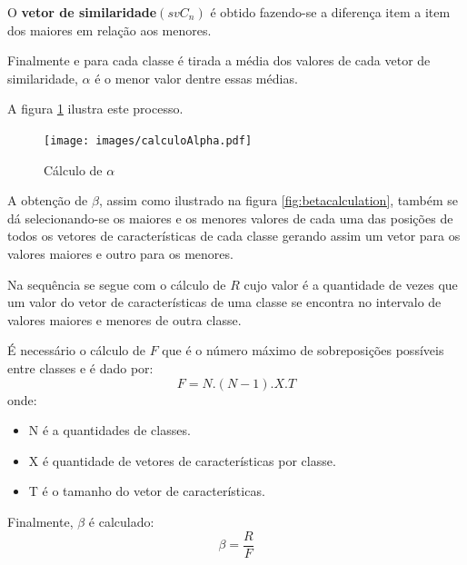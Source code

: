 \begin{myenv}{1.5}
					\par O \textbf{vetor de similaridade}$(svC_n)$ é obtido fazendo-se a diferença item a item dos maiores em relação aos menores.
					
					\par Finalmente e para cada classe é tirada a média dos valores de cada vetor de similaridade, $\alpha$ é o menor valor dentre essas médias.
					
					\par A figura \ref{fig:calculoalpha} ilustra este processo.
					
					\begin{figure}[h]
						\centering
						\texttt{[image: images/calculoAlpha.pdf]}
						\caption{Cálculo de $\alpha$}
						\label{fig:calculoalpha}
					\end{figure}
					
					\par A obtenção de $\beta$, assim como ilustrado na figura \ref{fig:betacalculation}, também se dá selecionando-se os maiores e os menores valores de cada uma das posições de todos os vetores de características de cada classe gerando assim um vetor para os valores maiores e outro para os menores.
					
					\par Na sequência se segue com o cálculo de $R$ cujo valor é a quantidade de vezes que um valor do vetor de características de uma classe se encontra no intervalo de valores maiores e menores de outra classe.
					
					\par É necessário o cálculo de $F$ que é o número máximo de sobreposições possíveis entre classes e é dado por:
					\begin{equation}
							F=N.(N-1).X.T
					\end{equation}
					onde:
					\begin{itemize}
						\item N é a quantidades de classes.
						\item X é quantidade de vetores de características por classe.
						\item T é o tamanho do vetor de características.
					\end{itemize}

					\par Finalmente, $\beta$ é calculado:
					\begin{equation}
						\beta=\dfrac{R}{F}
					\end{equation}
				

\end{myenv}
